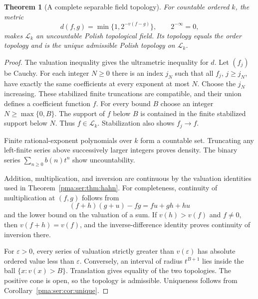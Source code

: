 \documentclass[11pt]{article}
\numberwithin{equation}{section}
\newtheorem{theorem}{Theorem}[section]
\theoremstyle{definition}
\theoremstyle{remark}
\newcommand{\Lk}{\mathcal L_k}
\begin{document}
\begin{theorem}[A complete separable field topology]\label{pma:ser:thm:lc}
For countable ordered $k$, the metric
\begin{equation}\label{pma:ser:eq:metric}
 d(f,g)=\min\{1,2^{-v(f-g)}\},\qquad 2^{-\infty}=0,
\end{equation}
makes $\Lk$ an uncountable Polish topological field. Its topology equals the
order topology and is the unique admissible Polish topology on $\Lk$.
\end{theorem}
\begin{proof}
The valuation inequality gives the ultrametric inequality for $d$.
Let $(f_j)$ be Cauchy. For each integer $N\geq0$ there is an index $j_N$
such that all $f_j$, $j\geq j_N$, have exactly the same coefficients at every
exponent at most $N$. Choose the $j_N$ increasing. These stabilized finite
truncations are compatible, and their union defines a coefficient function
$f$. For every bound $B$ choose an integer $N\geq\max\{0,B\}$.
The support of $f$ below $B$ is contained in the finite stabilized support
below $N$. Thus $f\in\Lk$. Stabilization also shows $f_j\to f$.

Finite rational-exponent polynomials over $k$ form a countable set. Truncating
any left-finite series above successively larger integers proves density.
The binary series $\sum_{n\geq0}b(n)t^n$ show uncountability.

Addition, multiplication, and inversion are continuous by the valuation
identities used in Theorem~\ref{pma:ser:thm:hahn}. For completeness, continuity of
multiplication at $(f,g)$ follows from
\[
 (f+h)(g+u)-fg=fu+gh+hu
\]
and the lower bound on the valuation of a sum. If $v(h)>v(f)$ and $f\ne0$,
then $v(f+h)=v(f)$, and the inverse-difference identity proves continuity of
inversion there.

For $\varepsilon>0$, every series of valuation strictly greater than
$v(\varepsilon)$ has absolute ordered value less than $\varepsilon$.
Conversely, an interval of radius $t^{B+1}$ lies inside the ball
$\{x:v(x)>B\}$. Translation gives equality of the two topologies.
The positive cone is open, so the topology is admissible. Uniqueness follows
from Corollary~\ref{pma:ser:cor:unique}.
\end{proof}
\end{document}
